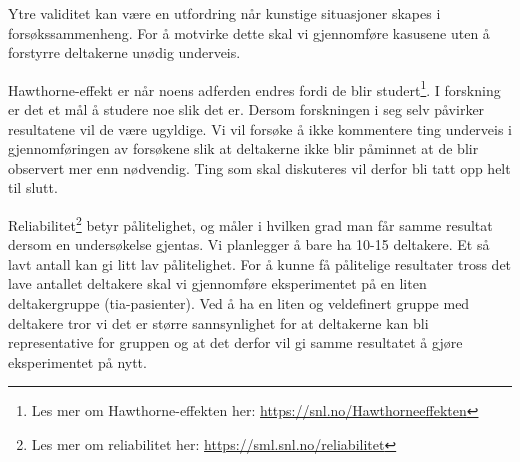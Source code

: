 Ytre validitet kan være en utfordring når kunstige situasjoner skapes i forsøkssammenheng. For å motvirke dette skal vi gjennomføre kasusene uten å forstyrre deltakerne unødig underveis.

Hawthorne-effekt er når noens adferden endres fordi de blir studert\footnote{Les mer om Hawthorne-effekten her: \url{https://snl.no/Hawthorneeffekten}}. I forskning er det et mål å studere noe slik det er. Dersom forskningen i seg selv påvirker resultatene vil de være ugyldige. Vi vil forsøke å ikke kommentere ting underveis i gjennomføringen av forsøkene slik at deltakerne ikke blir påminnet at de blir observert mer enn nødvendig. Ting som skal diskuteres vil derfor bli tatt opp helt til slutt. 

Reliabilitet\footnote{Les mer om reliabilitet her: \url{https://sml.snl.no/reliabilitet}} betyr pålitelighet, og måler i hvilken grad man får samme resultat dersom en undersøkelse gjentas. Vi planlegger å bare ha 10-15 deltakere. Et så lavt antall kan gi litt lav pålitelighet. For å kunne få pålitelige resultater tross det lave antallet deltakere skal vi gjennomføre eksperimentet på en liten deltakergruppe (\acrshort{tia}-pasienter). Ved å ha en liten og veldefinert gruppe med deltakere tror vi det er større sannsynlighet for at deltakerne kan bli representative for gruppen og at det derfor vil gi samme resultatet å gjøre eksperimentet på nytt.


